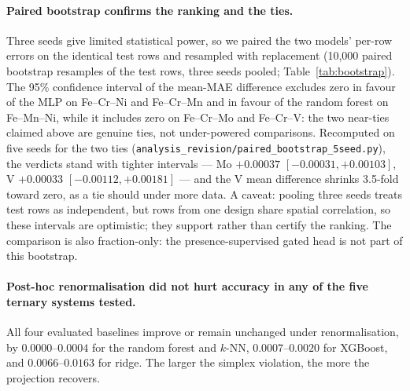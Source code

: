 \documentclass[preprint,12pt,authoryear]{elsarticle}
\begin{document}
\paragraph{Paired bootstrap confirms the ranking and the ties.}
Three seeds give limited statistical power, so we paired the two models'
per-row errors on the identical test rows and resampled with replacement
(10{,}000 paired bootstrap resamples of the test rows, three seeds pooled;
Table~\ref{tab:bootstrap}). The
95\% confidence interval of the mean-MAE difference excludes zero in favour
of the MLP on Fe--Cr--Ni and Fe--Cr--Mn and in favour of the random forest
on Fe--Mn--Ni, while it includes zero on Fe--Cr--Mo and Fe--Cr--V: the two
near-ties claimed above are genuine ties, not under-powered comparisons.
Recomputed on five seeds for the two ties
(\texttt{analysis\_revision/paired\_bootstrap\_5seed.py}),
the verdicts stand with tighter intervals --- Mo $+0.00037$
$[-0.00031, +0.00103]$, V $+0.00033$ $[-0.00112, +0.00181]$ --- and the
V mean difference shrinks 3.5-fold toward zero, as a tie should under
more data.
A caveat: pooling three seeds treats test rows as independent, but rows
from one design share spatial correlation, so these intervals are
optimistic; they support rather than certify the ranking. The comparison
is also fraction-only: the presence-supervised gated head is not part of
this bootstrap.

\begin{table}[htbp]
\centering
\caption{Paired bootstrap comparison of the best constrained MLP head and
the random forest on the interpolation test set. $\overline{\Delta}$MAE is
the mean per-row MAE difference (MLP $-$ RF); a negative value favours the
MLP. CI: 95\% bootstrap confidence interval (10{,}000 paired bootstrap
resamples of the test rows, three seeds pooled).}
\label{tab:bootstrap}
\small

\end{table}

\paragraph{Post-hoc renormalisation did not hurt accuracy in any of the
five ternary systems tested.}
All four evaluated baselines improve or remain unchanged under
renormalisation, by $0.0000$--$0.0004$ for the
random forest and $k$-NN, $0.0007$--$0.0020$ for XGBoost, and
$0.0066$--$0.0163$ for ridge. The larger the simplex violation, the more the
projection recovers.
\end{document}
